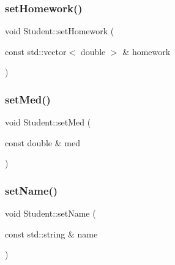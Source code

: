 \mbox{\label{class_student_a9f667f98c5b87ad21643090de3d69508}} 
\subsubsection{\texorpdfstring{setHomework()}{setHomework()}}
{\footnotesize\ttfamily void Student\+::set\+Homework (\begin{DoxyParamCaption}\item[{const std\+::vector$<$ double $>$ \&}]{homework }\end{DoxyParamCaption})\hspace{0.3cm}{\ttfamily [inline]}}

\mbox{\label{class_student_a129afdaabbf26f19413101595a8428b2}} 
\subsubsection{\texorpdfstring{setMed()}{setMed()}}
{\footnotesize\ttfamily void Student\+::set\+Med (\begin{DoxyParamCaption}\item[{const double \&}]{med }\end{DoxyParamCaption})\hspace{0.3cm}{\ttfamily [inline]}}

\mbox{\label{class_student_a489c963162c2b5798154a3217815cfc8}} 
\subsubsection{\texorpdfstring{setName()}{setName()}}
{\footnotesize\ttfamily void Student\+::set\+Name (\begin{DoxyParamCaption}\item[{const std\+::string \&}]{name }\end{DoxyParamCaption})\hspace{0.3cm}{\ttfamily [inline]}}

\mbox{\label{class_student_a60c08d94f09c69cec567ed399dbafde1}} 
